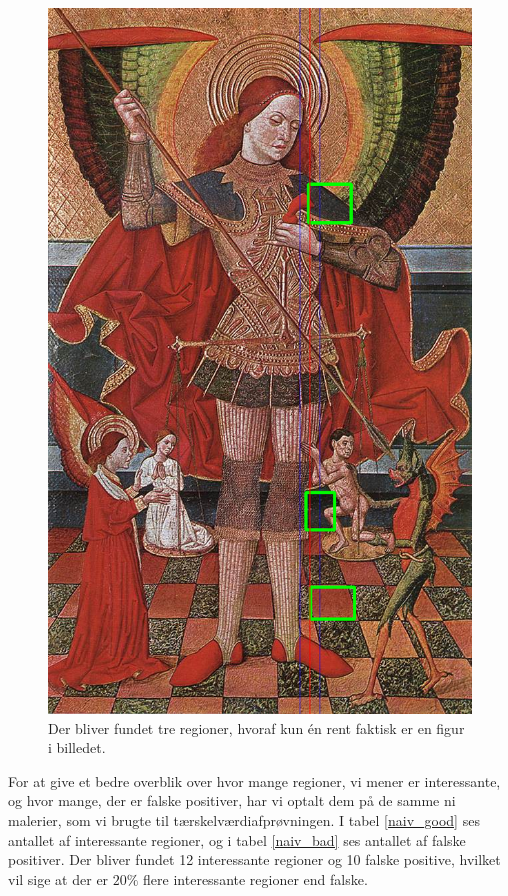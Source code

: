 \begin{figure}[h!!]
	\begin{center}
		\includegraphics[scale=0.3,angle=0]{afsnit/afprovning/billeder/naive_losning/naiv_virker_ikke3.png}
	\end{center}
	\caption[]{Der bliver fundet tre regioner, hvoraf kun \'{e}n rent
	faktisk er en figur i billedet.}
	\label{naiv_virker_ikke3}
\end{figure}
\clearpage

For at give et bedre overblik over hvor mange regioner, vi mener er
interessante, og hvor mange, der er falske positiver, har vi optalt dem på
de samme ni malerier, som vi brugte til tærskelværdiafprøvningen. I tabel
\ref{naiv_good} ses antallet af interessante regioner, og i tabel
\ref{naiv_bad} ses antallet af falske positiver. Der bliver fundet 12
interessante regioner og 10 falske positive, hvilket vil sige at der er $20
\%$ flere interessante regioner end falske.

